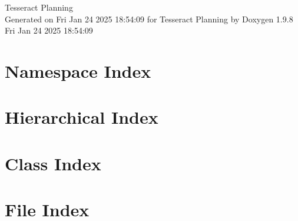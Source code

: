 \documentclass[twoside]{book}
\newcommand{\+}{\discretionary{\mbox{\scriptsize$\hookleftarrow$}}{}{}}
\newcommand{\clearemptydoublepage}{%
    \newpage{\pagestyle{empty}\cleardoublepage}%
  }
\begin{document}
  \raggedbottom
    \hypersetup{pageanchor=false,
                bookmarksnumbered=true,
                pdfencoding=unicode
               }
  \begin{titlepage}
  \vspace*{7cm}
  \begin{center}%
  {\Large Tesseract Planning}\\
  \vspace*{1cm}
  {\large Generated on Fri Jan 24 2025 18\+:54\+:09 for Tesseract Planning by Doxygen 1.9.8}\\
    \vspace*{0.5cm}
    {\small Fri Jan 24 2025 18:54:09}
  \end{center}
  \end{titlepage}
  \clearemptydoublepage
  \tableofcontents
  \clearemptydoublepage
  \hypersetup{pageanchor=true}




\chapter{Namespace Index}

\chapter{Hierarchical Index}

\chapter{Class Index}

\chapter{File Index}

\end{document}

